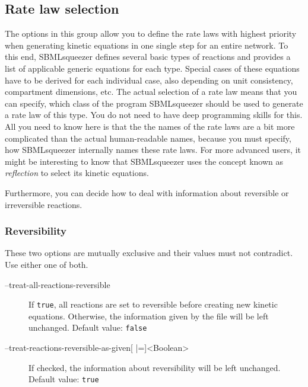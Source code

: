 \subsection{Rate law selection}
\label{sec:Rate_law_selection}
The options in this group allow you to define the rate laws with highest
priority when generating kinetic equations in one single step for an entire
network.
To this end, SBMLsqueezer defines several basic types of reactions and provides
a list of applicable generic equations for each type. Special cases of these
equations have to be derived for each individual case, also depending on
unit consistency, compartment dimensions, etc.
The actual selection of a rate law means that you can specify, which class of
the program SBMLsqueezer should be used to generate a rate law of this type.
You do not need to have deep programming skills for this. All you need to know
here is that the the names of the rate laws are a bit more complicated than the
actual human-readable names, because you must specify, how SBMLsqueezer
internally names these rate laws. For more advanced users, it might be
interesting to know that SBMLsqueezer uses the concept known as \emph{reflection} to
select its kinetic equations.

Furthermore, you can decide how to deal with information about reversible or
irreversible reactions.

\subsubsection{Reversibility}

These two options are mutually exclusive and their values must not contradict.
Use either one of both.
\begin{description}
\item[--treat-all-reactions-reversible]
  If \texttt{true}, all reactions are set to reversible before creating
  new kinetic equations. Otherwise, the information given by the
  \SBML file will be left unchanged.
  Default value: \texttt{false}

\item[--treat-reactions-reversible-as-given{[} |={]}<Boolean>]
  If checked, the information about reversibility will be left unchanged.
  Default value: \texttt{true}
\end{description}


